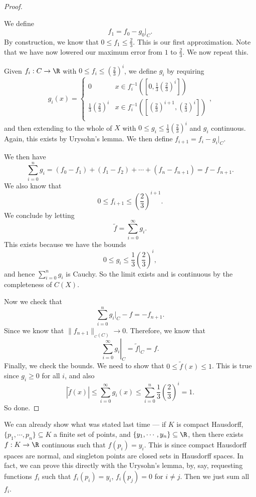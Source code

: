 \documentclass[a4paper]{article}
\begin{document}
\begin{proof}
\begin{center}
  \end{center}
  We define
  \[
    f_1 = f_0 - g_0|_C.
  \]
  By construction, we know that $0 \leq f_1 \leq \frac{2}{3}$. This is our first approximation. Note that we have now lowered our maximum error from $1$ to $\frac{2}{3}$. We now repeat this.

  Given $f_i: C \to \R$ with $0 \leq f_i \leq \left(\frac{2}{3}\right)^i$, we define $g_i$ by requiring
  \[
    g_i(x) =
    \begin{cases}
      0 & x \in f_i^{-1}\left(\left[0, \frac{1}{3}\left(\frac{2}{3}\right)^i\right]\right)\\
      \frac{1}{3}\left(\frac{2}{3}\right)^i & x \in f_i^{-1}\left(\left[\left(\frac{2}{3}\right)^{i + 1}, \left(\frac{2}{3}\right)^i\right]\right)\\
    \end{cases},
  \]
  and then extending to the whole of $X$ with $0 \leq g_i \leq \frac{1}{3}\left(\frac{2}{3}\right)^i$ and $g_i$ continuous. Again, this exists by Urysohn's lemma. We then define $f_{i + 1} = f_i - g_i|_C$.

  We then have
  \[
    \sum_{i = 0}^n g_i = (f_0 - f_1) + (f_1 - f_2) + \cdots + (f_n - f_{n + 1}) = f - f_{n + 1}.
  \]
  We also know that
  \[
    0 \leq f_{i + 1} \leq \left(\frac{2}{3}\right)^{i + 1}.
  \]
  We conclude by letting
  \[
    \tilde{f} = \sum_{i = 0}^\infty g_i.
  \]
  This exists because we have the bounds
  \[
    0 \leq g_i \leq \frac{1}{3}\left(\frac{2}{3}\right)^i,
  \]
  and hence $\sum_{i = 0}^n g_i$ is Cauchy. So the limit exists and is continuous by the completeness of $C(X)$.

  Now we check that
  \[
    \sum_{i = 0}^n g_i|_C - f = -f_{n + 1}.
  \]
  Since we know that $\|f_{n + 1}\|_{_C(C)} \to 0$. Therefore, we know that
  \[
    \left.\sum_{i = 0}^\infty g_i\right|_C = \tilde{f}|_C = f.
  \]
  Finally, we check the bounds. We need to show that $0 \leq \tilde{f}(x) \leq 1$. This is true since $g_i \geq 0$ for all $i$, and also
  \[
    |\tilde{f}(x)| \leq \sum_{i = 0}^\infty g_i(x) \leq \sum_{i = 0}^n \frac{1}{3}\left(\frac{2}{3}\right)^i = 1.
  \]
  So done.
\end{proof}
We can already show what was stated last time --- if $K$ is compact Hausdorff, $\{p_1, \cdots, p_n\}\subseteq K$ a finite set of points, and $\{y_1, \cdots, y_n\} \subseteq \R$, then there exists $f: K \to \R$ continuous such that $f(p_i) = y_i$. This is since compact Hausdorff spaces are normal, and singleton points are closed sets in Hausdorff spaces. In fact, we can prove this directly with the Urysohn's lemma, by, say, requesting functions $f_i$ such that $f_i(p_i) = y_i$, $f_i(p_j) = 0$ for $i \not= j$. Then we just sum all $f_i$.
\end{document}
